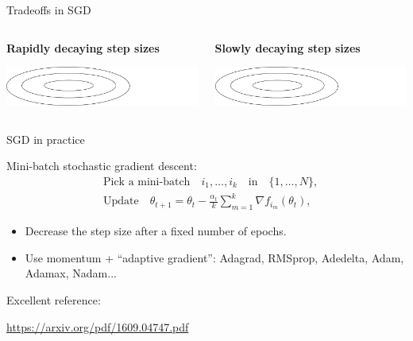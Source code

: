 \documentclass{beamer}
\begin{document}
\begin{frame}[t]{Tradeoffs in SGD}
	\grid

	\begin{columns}
		\begin{column}{0.45\textwidth}
			\vspace{-0.5cm}
			\begin{center}
				\textbf{Rapidly decaying step sizes}
			\end{center}
			\hspace*{-0.4cm}\includegraphics[width=9cm]{../figures/contour.pdf}
			\vspace{2.7cm}
	\end{column}
	\vrule
		\begin{column}{0.55\textwidth}
			\vspace{-0.5cm}
			\begin{center}
				\textbf{Slowly decaying step sizes}
			\end{center}
			\hspace*{0.4cm}\includegraphics[width=9cm]{../figures/contour.pdf}
			\vspace{2.7cm}
	\end{column}
	\end{columns}

\end{frame}

\begin{frame}[t]{SGD in practice}
	\grid
	\vspace{-0.6cm}
	\begin{exampleblock}{}
		Mini-batch stochastic gradient descent:
\begin{align*}
	&\text{Pick a mini-batch} \quad i_1, \dots, i_k \quad \text{in} \quad \{1, \dots, N\}, \\
	&\text{Update} \quad \theta_{t+1} = \theta_t - \frac{\alpha_t}{k}\sum_{m=1}^k \nabla f_{i_m}(\theta_t),
\end{align*}
	\end{exampleblock}

	\begin{itemize}
		\item Decrease the step size after a fixed number of epochs.
		\item Use momentum + ``adaptive gradient'': Adagrad, RMSprop, Adedelta, Adam, Adamax, Nadam...
	\end{itemize}
	\vspace{0.3cm}

	Excellent reference:
	\begin{center}
		\url{https://arxiv.org/pdf/1609.04747.pdf}
	\end{center}

\end{frame}
\end{document}
